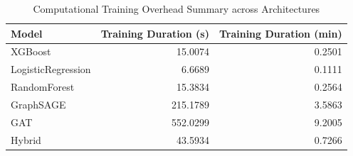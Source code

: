 \begin{table}
\caption{Computational Training Overhead Summary across Architectures}
\label{tab:training_times}
\begin{tabular}{lrr}
\toprule
Model & Training Duration (s) & Training Duration (min) \\
\midrule
XGBoost & 15.0074 & 0.2501 \\
LogisticRegression & 6.6689 & 0.1111 \\
RandomForest & 15.3834 & 0.2564 \\
GraphSAGE & 215.1789 & 3.5863 \\
GAT & 552.0299 & 9.2005 \\
Hybrid & 43.5934 & 0.7266 \\
\bottomrule
\end{tabular}
\end{table}
